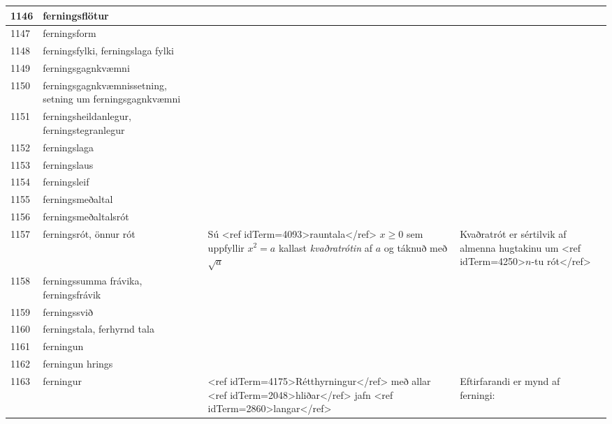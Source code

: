 \begin{longtable}{p{}|p{}|p{}|p{}|p{}}
\hline
1146 & ferningsflötur &  &  &  \\
\hline
1147 & ferningsform &  &  &  \\
\hline
1148 & ferningsfylki, ferningslaga fylki &  &  &  \\
\hline
1149 & ferningsgagnkvæmni &  &  &  \\
\hline
1150 & ferningsgagnkvæmnissetning, setning um ferningsgagnkvæmni &  &  &  \\
\hline
1151 & ferningsheildanlegur, ferningstegranlegur &  &  &  \\
\hline
1152 & ferningslaga &  &  &  \\
\hline
1153 & ferningslaus &  &  &  \\
\hline
1154 & ferningsleif &  &  &  \\
\hline
1155 & ferningsmeðaltal &  &  &  \\
\hline
1156 & ferningsmeðaltalsrót &  &  &  \\
\hline
1157 & ferningsrót, önnur rót & 
Sú <ref idTerm=4093>rauntala</ref> $x \geq 0$ sem uppfyllir $x^2=a$ kallast \textit{kvaðratrótin} af $a$ og táknuð með $\sqrt{a}$ & Kvaðratrót er sértilvik af almenna hugtakinu um <ref idTerm=4250>$n$-tu rót</ref> & \\
\hline
1158 & ferningssumma frávika, ferningsfrávik &  &  &  \\
\hline
1159 & ferningssvið &  &  &  \\
\hline
1160 & ferningstala, ferhyrnd tala &  &  &  \\
\hline
1161 & ferningun &  &  &  \\
\hline
1162 & ferningun hrings &  &  &  \\
\hline
1163 & ferningur & <ref idTerm=4175>Rétthyrningur</ref> með allar <ref idTerm=2048>hliðar</ref> jafn <ref idTerm=2860>langar</ref> & Eftirfarandi er mynd af ferningi:


\end{longtable}
